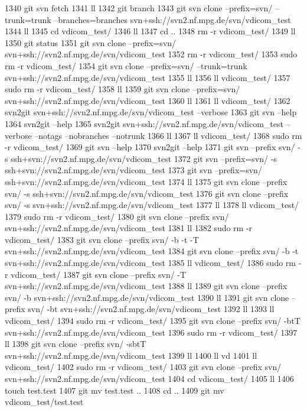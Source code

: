  1340  git svn fetch
 1341  ll
 1342  git branch
 1343  git svn clone --prefix=svn/ --trunk=trunk --branches=branches svn+ssh://svn2.nf.mpg.de/svn/vdicom_test
 1344  ll
 1345  cd vdicom_test/
 1346  ll
 1347  cd ..
 1348  rm -r vdicom_test/
 1349  ll
 1350  git status
 1351  git svn clone --prefix=svn/ svn+ssh://svn2.nf.mpg.de/svn/vdicom_test
 1352  rm -r vdicom_test/
 1353  sudo rm -r vdicom_test/
 1354  git svn clone --prefix=svn/ --trunk=trunk svn+ssh://svn2.nf.mpg.de/svn/vdicom_test
 1355  ll
 1356  ll vdicom_test/
 1357  sudo rm -r vdicom_test/
 1358  ll
 1359  git svn clone --prefix=svn/ svn+ssh://svn2.nf.mpg.de/svn/vdicom_test
 1360  ll
 1361  ll vdicom_test/
 1362  svn2git svn+ssh://svn2.nf.mpg.de/svn/vdicom_test --verbose
 1363  git svn --help
 1364  svn2git --help
 1365  svn2git svn+ssh://svn2.nf.mpg.de/svn/vdicom_test --verbose --notags --nobranches --notrunk
 1366  ll
 1367  ll vdicom_test/
 1368  sudo rm -r vdicom_test/
 1369  git svn --help
 1370  svn2git --help
 1371  git svn --prefix svn/ -s ssh+svn://svn2.nf.mpg.de/svn/vdicom_test 
 1372  git svn --prefix=svn/ -s ssh+svn://svn2.nf.mpg.de/svn/vdicom_test 
 1373  git svn --prefix=svn/ ssh+svn://svn2.nf.mpg.de/svn/vdicom_test 
 1374  ll
 1375  git svn clone --prefix svn/ -s ssh+svn://svn2.nf.mpg.de/svn/vdicom_test 
 1376  git svn clone --prefix svn/ -s svn+ssh://svn2.nf.mpg.de/svn/vdicom_test 
 1377  ll
 1378  ll vdicom_test/
 1379  sudo rm -r vdicom_test/
 1380  git svn clone --prefix svn/ svn+ssh://svn2.nf.mpg.de/svn/vdicom_test 
 1381  ll
 1382  sudo rm -r vdicom_test/
 1383  git svn clone --prefix svn/ -b -t -T svn+ssh://svn2.nf.mpg.de/svn/vdicom_test 
 1384  git svn clone --prefix svn/ -b -t svn+ssh://svn2.nf.mpg.de/svn/vdicom_test 
 1385  ll vdicom_test/
 1386  sudo rm -r vdicom_test/
 1387  git svn clone --prefix svn/ -T svn+ssh://svn2.nf.mpg.de/svn/vdicom_test 
 1388  ll
 1389  git svn clone --prefix svn/ -b svn+ssh://svn2.nf.mpg.de/svn/vdicom_test 
 1390  ll
 1391  git svn clone --prefix svn/ -bt svn+ssh://svn2.nf.mpg.de/svn/vdicom_test 
 1392  ll
 1393  ll vdicom_test/
 1394  sudo rm -r vdicom_test/
 1395  git svn clone --prefix svn/ -btT svn+ssh://svn2.nf.mpg.de/svn/vdicom_test 
 1396  sudo rm -r vdicom_test/
 1397  ll
 1398  git svn clone --prefix svn/ -sbtT svn+ssh://svn2.nf.mpg.de/svn/vdicom_test 
 1399  ll
 1400  ll vd
 1401  ll vdicom_test/
 1402  sudo rm -r vdicom_test/
 1403  git svn clone --prefix svn/ svn+ssh://svn2.nf.mpg.de/svn/vdicom_test 
 1404  cd vdicom_test/
 1405  ll
 1406  touch test.test
 1407  git mv test.test ..
 1408  cd ..
 1409  git mv vdicom_test/test.test 
